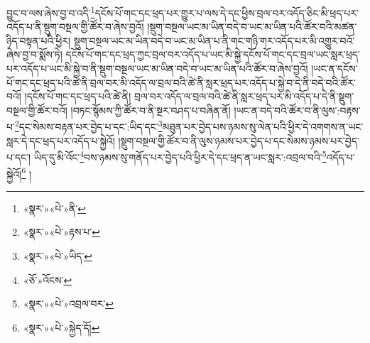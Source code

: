 བྱུང་བ་ལས་ཞེས་བྱ་བ་འདི་\footnote{«སྣར་»«པེ་»ནི་}དངོས་པོ་གང་དང་ཕྲད་པར་གྱུར་པ་ལས་དེ་དང་ཕྱིས་བྲལ་བར་འདོད་ཅིང་མི་ཕྲད་པར་འདོད་པ་ནི་སྡུག་བསྔལ་གྱི་ཚོར་བ་ཞེས་བྱའོ། །སྡུག་བསྔལ་ཡང་མ་ཡིན་བདེ་བ་ཡང་མ་ཡིན་པའི་ཚོར་བའི་མཚན་ཉིད་བསྟན་པའི་ཕྱིར། སྡུག་བསྔལ་ཡང་མ་ཡིན་བདེ་བ་ཡང་མ་ཡིན་པ་ནི་གང་གཉི་གར་འདོད་པར་མི་འགྱུར་བའོ་ཞེས་བྱ་བ་སྨོས་ཏེ། དངོས་པོ་གང་དང་ཕྲད་ཀྱང་བྲལ་བར་འདོད་པ་ཡང་མི་སྐྱེ་དངོས་པོ་གང་དང་བྲལ་ཡང་སླར་ཕྲད་པར་འདོད་པ་ཡང་མི་སྐྱེ་བ་ནི་སྡུག་བསྔལ་ཡང་མ་ཡིན་བདེ་བ་ཡང་མ་ཡིན་པའི་ཚོར་བ་ཞེས་བྱའོ། །ཡང་ན་དངོས་པོ་གང་དང་ཕྲད་པའི་ཚེ་ནི་བྲལ་བར་མི་འདོད་ལ་བྲལ་བའི་ཚེ་ནི་སླར་ཕྲད་པར་འདོད་པ་སྐྱེ་བ་དེ་ནི་བདེ་བའི་ཚོར་བའོ། །དངོས་པོ་གང་དང་ཕྲད་པའི་ཚེ་ནི། བྲལ་བར་འདོད་ལ་བྲལ་བའི་ཚེ་ནི་སླར་ཕྲད་པར་མི་འདོད་པ་དེ་ནི་སྡུག་བསྔལ་གྱི་ཚོར་བའོ། །བཏང་སྙོམས་ཀྱི་ཚོར་བ་ནི་སྔར་བཤད་པ་བཞིན་ནོ། །ཡང་ན་བདེ་བའི་ཚོར་བ་ནི་ལུས་:བརྟས་པ་\footnote{«སྣར་»«པེ་»རྟས་པ་}དང་སེམས་བརྟན་པར་བྱེད་པ་དང་:ཡིད་དང་\footnote{«སྣར་»«པེ་»ཡིད་}མཐུན་པར་བྱེད་པས་ཉམས་སུ་ལེན་པའི་ཕྱིར་དེ་འགགས་ན་ཡང་སླར་དེ་དང་ཕྲད་པར་འདོད་པ་སྐྱེའོ། །སྡུག་བསྔལ་གྱི་ཚོར་བ་ནི་ལུས་ཉམས་པར་བྱེད་པ་དང་སེམས་ཉམས་པར་བྱེད་པ་དང་། ཡིད་དུ་མི་འོང་\footnote{«ཅོ་»འོངས་}བས་ཉམས་སུ་གནོད་པར་བྱེད་པའི་ཕྱིར་དེ་དང་ཕྲད་ན་ཡང་སླར་:འབྲལ་བའི་\footnote{«སྣར་»«པེ་»འབྲལ་བར་}འདོད་པ་སྐྱེའོ།\footnote{«སྣར་»«པེ་»སྐྱེད་དོ།} །
